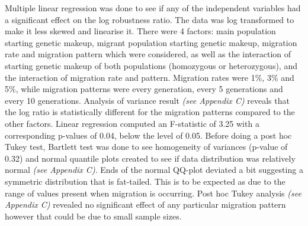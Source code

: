 Multiple linear regression was done to see if any of the independent variables had a significant effect on the log robustness ratio. The data was log transformed to make it less skewed and linearise it. There were 4 factors: main population starting genetic makeup, migrant population starting genetic makeup, migration rate and migration pattern which were considered, as well as the interaction of starting genetic makeup of both populations (homozygous or heterozygous), and the interaction of migration rate and pattern. Migration rates were 1\%, 3\% and 5\%, while migration patterns were every generation, every 5 generations and every 10 generations. Analysis of variance result \textit{(see Appendix C)} reveals that the log ratio is statistically different for the migration patterns compared to the other factors. Linear regression computed an F-statistic of 3.25 with a corresponding p-values of 0.04, below the \textalpha level of 0.05. Before doing a post hoc Tukey test, Bartlett test was done to see homogeneity of variances (p-value of 0.32) and normal quantile plots created to see if data distribution was relatively normal \textit{(see Appendix C)}. Ends of the normal QQ-plot deviated a bit suggesting a symmetric distribution that is fat-tailed. This is to be expected as due to the range of values present when migration is occurring. Post hoc Tukey analysis \textit{(see Appendix C)} revealed no significant effect of any particular migration pattern however that could be due to small sample sizes.
